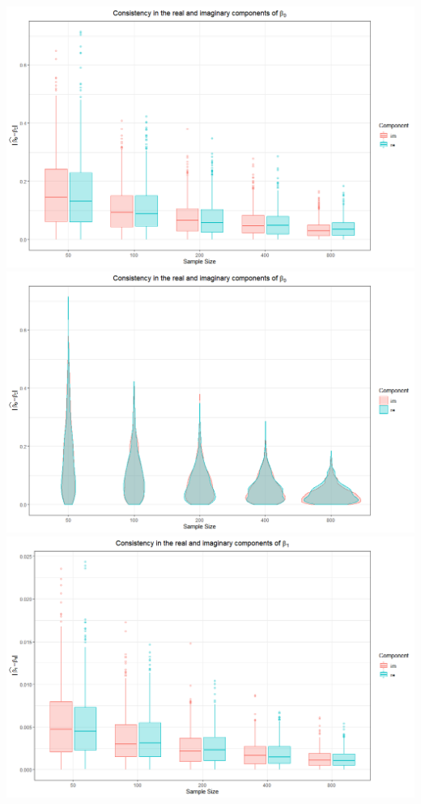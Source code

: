 \documentclass[honours,12pt]{unswthesis}
\numberwithin{equation}{section}
\begin{document}
\begin{center}
	\includegraphics[width = \textwidth]{graphics/CM_consistency_b0_b}
	\includegraphics[width = \textwidth]{graphics/CM_consistency_b0_v}
	\includegraphics[width = \textwidth]{graphics/CM_consistency_b1_b}

\end{center}
\end{document}
